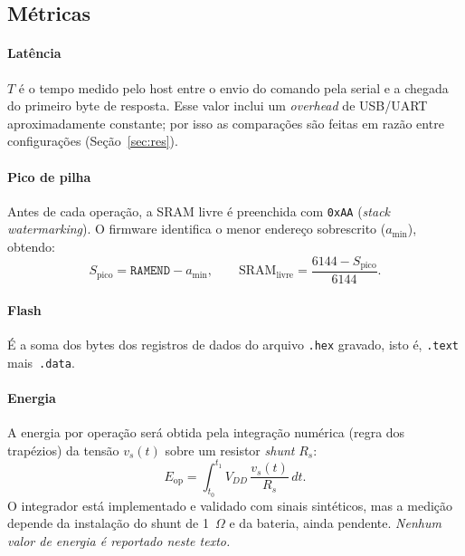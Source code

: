 \documentclass[acmsmall,nonacm,language=english,language=brazilian]{acmart}
\begin{document}
\subsection{Métricas}
\label{sec:metricas}
\paragraph{Latência} $T$ é o tempo medido pelo host entre o envio do comando
pela serial e a chegada do primeiro byte de resposta. Esse valor inclui um
\emph{overhead} de USB/UART aproximadamente constante; por isso as comparações
são feitas em razão entre configurações (Seção~\ref{sec:res}).

\paragraph{Pico de pilha} Antes de cada operação, a SRAM livre é
preenchida com \texttt{0xAA} (\emph{stack watermarking}). O firmware
identifica o menor endereço sobrescrito ($a_{\min}$), obtendo:
\begin{equation}
  S_{\text{pico}} = \texttt{RAMEND} - a_{\min},
  \qquad
  \text{SRAM}_{\text{livre}} = \frac{6144 - S_{\text{pico}}}{6144}.
  \label{eq:stack}
\end{equation}

\paragraph{Flash} É a soma dos bytes dos registros de dados do arquivo
\texttt{.hex} gravado, isto é, \texttt{.text} mais~\texttt{.data}.

\paragraph{Energia} A energia por operação será obtida pela integração
numérica (regra dos trapézios) da tensão $v_s(t)$ sobre um resistor
\emph{shunt} $R_s$:
\begin{equation}
  E_{\text{op}} = \int_{t_0}^{t_1} V_{DD}\,\frac{v_s(t)}{R_s}\,dt .
  \label{eq:energy}
\end{equation}
O integrador está implementado e validado com sinais sintéticos, mas a
medição depende da instalação do shunt de 1~$\Omega$ e da bateria, ainda
pendente. \emph{Nenhum valor de energia é reportado neste texto.}
\end{document}
